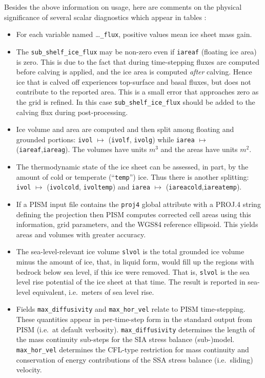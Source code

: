Besides the above information on usage, here are comments on the physical significance of several scalar diagnostics which appear in tables \alltsvars:
\begin{itemize}
  \item For each variable named \dots\texttt{_flux}, positive values mean ice sheet mass gain.
  \item The \texttt{sub_shelf_ice_flux} may be non-zero even if \texttt{iareaf} (floating ice area) is zero. This is due to the fact that during time-stepping fluxes are computed before calving is applied, and the ice area is computed \emph{after} calving. Hence ice that is calved off experiences top-surface and basal fluxes, but does not contribute to the reported area. This is a small error that approaches zero as the grid is refined. In this case \texttt{sub_shelf_ice_flux} should be added to the calving flux during post-processing.
  \item Ice volume and area are computed and then split among floating and grounded portions: \texttt{ivol} $\mapsto$ (\texttt{ivolf}, \texttt{ivolg}) while \texttt{iarea} $\mapsto$ (\texttt{iareaf},\texttt{iareag}).  The volumes have units \textsl{$m^3$} and the areas have units \textsl{$m^2$}.
  \item The thermodynamic state of the ice sheet can be assessed, in part, by the amount of cold or temperate (``\texttt{temp}'') ice.  Thus there is another splitting: \texttt{ivol} $\mapsto$ (\texttt{ivolcold}, \texttt{ivoltemp}) and \texttt{iarea} $\mapsto$ (\texttt{iareacold},\texttt{iareatemp}).
  \item If a PISM input file contains the \texttt{proj4} global attribute with a PROJ.4 string defining the projection then PISM computes corrected cell areas
using this information, grid parameters, and the WGS84 reference ellipsoid. This yields areas and volumes with greater accuracy.
  \item The sea-level-relevant ice volume \texttt{slvol} is the total grounded ice volume minus the amount of ice, that, in liquid form, would fill up the regions with bedrock below sea level, if this ice were removed.  That is, \texttt{slvol} is the sea level rise potential of the ice sheet at that time.  The result is reported  in sea-level equivalent, i.e.~meters of sea level rise.
  \item Fields \texttt{max_diffusivity} and \texttt{max_hor_vel} relate to PISM time-stepping.  These quantities appear in per-time-step form in the standard output from PISM (i.e.~at default verbosity).  \texttt{max_diffusivity} determines the length of the mass continuity sub-steps for the SIA stress balance (sub-)model.  \texttt{max_hor_vel} determines the CFL-type restriction for mass continuity and conservation of energy contributions of the SSA stress balance (i.e.~sliding) velocity.
\end{itemize}

